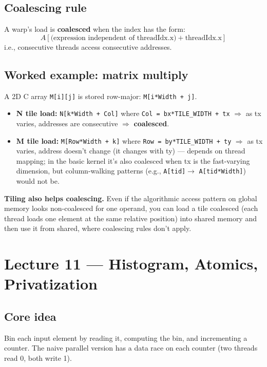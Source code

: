 \documentclass[10pt]{article}
\begin{document}
\subsection*{Coalescing rule}
\begin{keybox}
A warp's load is \textbf{coalesced} when the index has the form:
\[
A[\text{(expression independent of threadIdx.x)} + \text{threadIdx.x}]
\]
i.e., consecutive threads access consecutive addresses.
\end{keybox}

\subsection*{Worked example: matrix multiply}
A 2D C array \texttt{M[i][j]} is stored row-major: \texttt{M[i*Width + j]}.
\begin{itemize}
  \item \textbf{N tile load:} \texttt{N[k*Width + Col]} where \texttt{Col = bx*TILE\_WIDTH + tx} $\Rightarrow$ as tx varies, addresses are consecutive $\Rightarrow$ \textbf{coalesced}.
  \item \textbf{M tile load:} \texttt{M[Row*Width + k]} where \texttt{Row = by*TILE\_WIDTH + ty} $\Rightarrow$ as tx varies, address doesn't change (it changes with ty) — depends on thread mapping; in the basic kernel it's also coalesced when tx is the fast-varying dimension, but column-walking patterns (e.g., \texttt{A[tid]}$\rightarrow$ \texttt{A[tid*Width]}) would not be.
\end{itemize}

\begin{gotchabox}
\textbf{Tiling also helps coalescing.} Even if the algorithmic access pattern on global memory looks non-coalesced for one operand, you can load a tile coalesced (each thread loads one element at the same relative position) into shared memory and then use it from shared, where coalescing rules don't apply.
\end{gotchabox}

\hrulefill

\section{Lecture 11 — Histogram, Atomics, Privatization}

\subsection*{Core idea}
Bin each input element by reading it, computing the bin, and incrementing a counter. The naive parallel version has a data race on each counter (two threads read 0, both write 1).
\end{document}

